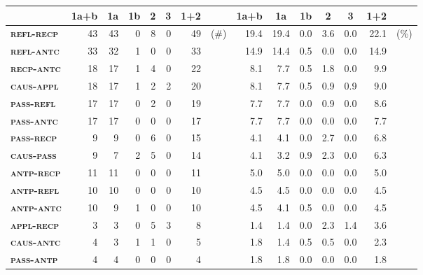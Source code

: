 \begin{table}
	\setlength{\tabcolsep}{3.4pt}
	\begin{tabularx}{\textwidth}{lrrrrrrlrrrrrrl}
		\lsptoprule
		& \multicolumn{1}{c}{\textbf{1a+b}} & \multicolumn{1}{c}{\textbf{1a}} & \multicolumn{1}{c}{\textbf{1b}} & \multicolumn{1}{c}{\textbf{2}} & \multicolumn{1}{c}{\textbf{3}} & \multicolumn{1}{c}{\textbf{1+2}} & & \multicolumn{1}{c}{\textbf{1a+b}} & \multicolumn{1}{c}{\textbf{1a}} & \multicolumn{1}{c}{\textbf{1b}} & \multicolumn{1}{c}{\textbf{2}} & \multicolumn{1}{c}{\textbf{3}} & \multicolumn{1}{c}{\textbf{1+2}} & \\
		\midrule
		\textbf{\textsc{refl-recp}} & 43 & 43 & 0 & 8 & 0 & 49 & (\#) & 19.4 & 19.4 & 0.0 & 3.6 & 0.0 & 22.1 & (\%) \\
		\textbf{\textsc{refl-antc}} & 33 & 32 & 1 & 0 & 0 & 33 & & 14.9 & 14.4 & 0.5 & 0.0 & 0.0 & 14.9 & \\
		\textbf{\textsc{recp-antc}} & 18 & 17 & 1 & 4 & 0 & 22 & & 8.1 & 7.7 & 0.5 & 1.8 & 0.0 & 9.9 & \\
		\textbf{\textsc{caus-appl}} & 18 & 17 & 1 & 2 & 2 & 20 & & 8.1 & 7.7 & 0.5 & 0.9 & 0.9 & 9.0 & \\
		\textbf{\textsc{pass-refl}} & 17 & 17 & 0 & 2 & 0 & 19 & & 7.7 & 7.7 & 0.0 & 0.9 & 0.0 & 8.6 & \\
		\textbf{\textsc{pass-antc}} & 17 & 17 & 0 & 0 & 0 & 17 & & 7.7 & 7.7 & 0.0 & 0.0 & 0.0 & 7.7 & \\
		\textbf{\textsc{pass-recp}} & 9 & 9 & 0 & 6 & 0 & 15 & & 4.1 & 4.1 & 0.0 & 2.7 & 0.0 & 6.8 & \\
		\textbf{\textsc{caus-pass}} & 9 & 7 & 2 & 5 & 0 & 14 & & 4.1 & 3.2 & 0.9 & 2.3 & 0.0 & 6.3 & \\
		\textbf{\textsc{antp-recp}} & 11 & 11 & 0 & 0 & 0 & 11 & & 5.0 & 5.0 & 0.0 & 0.0 & 0.0 & 5.0 & \\
		\textbf{\textsc{antp-refl}} & 10 & 10 & 0 & 0 & 0 & 10 & & 4.5 & 4.5 & 0.0 & 0.0 & 0.0 & 4.5 & \\
		\textbf{\textsc{antp-antc}} & 10 & 9 & 1 & 0 & 0 & 10 & & 4.5 & 4.1 & 0.5 & 0.0 & 0.0 & 4.5 & \\
		\textbf{\textsc{appl-recp}} & 3 & 3 & 0 & 5 & 3 & 8 & & 1.4 & 1.4 & 0.0 & 2.3 & 1.4 & 3.6 & \\
		\textbf{\textsc{caus-antc}} & 4 & 3 & 1 & 1 & 0 & 5 & & 1.8 & 1.4 & 0.5 & 0.5 & 0.0 & 2.3 & \\
		\textbf{\textsc{pass-antp}} & 4 & 4 & 0 & 0 & 0 & 4 & & 1.8 & 1.8 & 0.0 & 0.0 & 0.0 & 1.8 & \\

\end{tabularx}
\end{table}
